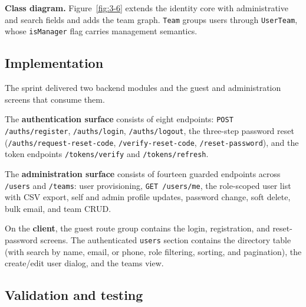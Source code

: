 
\textbf{Class diagram.} Figure~\ref{fig:3-6} extends the identity core with administrative and
search fields and adds the team graph. \texttt{Team} groups users through \texttt{UserTeam},
whose \texttt{isManager} flag carries management semantics.


\subsection{Implementation}

The sprint delivered two backend modules and the guest and administration screens that consume
them.

The \textbf{authentication surface} consists of eight endpoints: \texttt{POST /auths/register},
\texttt{/auths/login}, \texttt{/auths/logout}, the three-step password reset
(\texttt{/auths/request-reset-code}, \texttt{/verify-reset-code}, \texttt{/reset-password}), and
the token endpoints \texttt{/tokens/verify} and \texttt{/tokens/refresh}.

The \textbf{administration surface} consists of fourteen guarded endpoints across \texttt{/users}
and \texttt{/teams}: user provisioning, \texttt{GET /users/me}, the role-scoped user list with
CSV export, self and admin profile updates, password change, soft delete, bulk email, and team
CRUD.

On the \textbf{client}, the guest route group contains the login, registration, and
reset-password screens. The authenticated \texttt{users} section contains the directory table
(with search by name, email, or phone, role filtering, sorting, and pagination), the
create/edit user dialog, and the teams view.






\subsection{Validation and testing}

